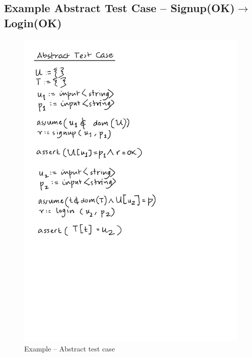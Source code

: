 \documentclass[12pts, a4paper]{article}
\begin{document}
\subsection{Example Abstract Test Case -- Signup(OK)$\rightarrow$Login(OK)}
\begin{figure}

\begin{center}
\includegraphics[width=\textwidth]{../images/spec-AST-9.png}
\end{center}
\caption{Example -- Abstract test case}
\label{f:act}
\end{figure}
\end{document}

